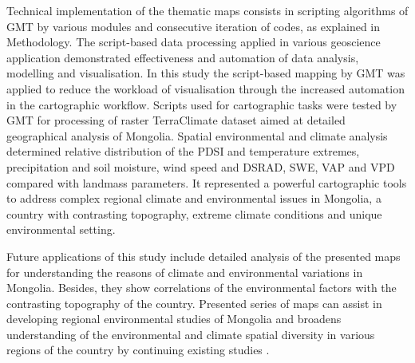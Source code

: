 \documentclass[geosciences,article,submit,pdftex,moreauthors]{Definitions/mdpi}
\begin{document}
Technical implementation of the thematic maps consists in scripting algorithms of GMT by various modules and consecutive iteration of codes, as explained in Methodology. The script-based data processing applied in various geoscience application \cite{Lemenkova2019c,Lemenkov2021} demonstrated effectiveness and automation of data analysis, modelling and visualisation. In this study the script-based mapping by GMT was applied to reduce the workload of visualisation through the increased automation in the cartographic workflow. Scripts used for cartographic tasks were tested by GMT for processing of raster TerraClimate dataset aimed at detailed geographical analysis of Mongolia. Spatial environmental and climate analysis determined relative distribution of the PDSI and temperature extremes, precipitation and soil moisture, wind speed and DSRAD, SWE, VAP and VPD compared with landmass parameters. It represented a powerful cartographic tools to address complex regional climate and environmental issues in Mongolia, a country with contrasting topography, extreme climate conditions and unique environmental setting. 

Future applications of this study include detailed analysis of the presented maps for understanding the reasons of climate and environmental variations in Mongolia. Besides, they show correlations of the environmental factors with the contrasting topography of the country. Presented series of maps can assist in developing regional environmental studies of Mongolia and broadens understanding of the environmental and climate spatial diversity in various regions of the country \cite{MAS,Pfeiffer} by continuing existing studies \cite{Altanbold,Jamyansuren,Jugder}. 
\end{document}
